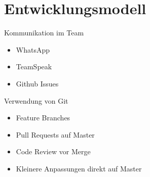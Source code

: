\documentclass[xcolor=dvipsnames]{beamer}
\begin{document}
\section{Entwicklungsmodell}
    \begin{frame}{Kommunikation im Team}
        \begin{itemize}
            \item WhatsApp
            \item TeamSpeak
            \item Github Issues
        \end{itemize}
    \end{frame}
    \begin{frame}{Verwendung von Git}
        \begin{itemize}
            \item Feature Branches
            \item Pull Requests auf Master
            \item Code Review vor Merge
            \item Kleinere Anpassungen direkt auf Master
        \end{itemize}
    \end{frame}
\end{document}
